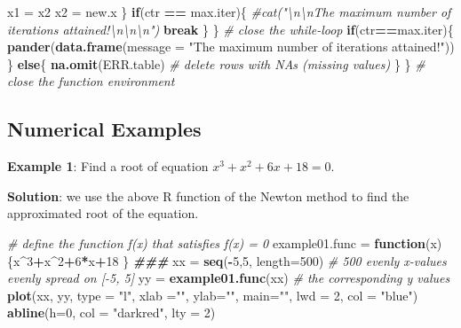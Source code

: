 \documentclass[
]{book}
\newenvironment{Shaded}{\begin{snugshade}}{\end{snugshade}}
\newcommand{\AttributeTok}[1]{\textcolor[rgb]{0.13,0.29,0.53}{#1}}
\newcommand{\CommentTok}[1]{\textcolor[rgb]{0.56,0.35,0.01}{\textit{#1}}}
\newcommand{\ControlFlowTok}[1]{\textcolor[rgb]{0.13,0.29,0.53}{\textbf{#1}}}
\newcommand{\DecValTok}[1]{\textcolor[rgb]{0.00,0.00,0.81}{#1}}
\newcommand{\DocumentationTok}[1]{\textcolor[rgb]{0.56,0.35,0.01}{\textbf{\textit{#1}}}}
\newcommand{\FunctionTok}[1]{\textcolor[rgb]{0.13,0.29,0.53}{\textbf{#1}}}
\newcommand{\NormalTok}[1]{#1}
\newcommand{\OtherTok}[1]{\textcolor[rgb]{0.56,0.35,0.01}{#1}}
\newcommand{\SpecialCharTok}[1]{\textcolor[rgb]{0.81,0.36,0.00}{\textbf{#1}}}
\newcommand{\StringTok}[1]{\textcolor[rgb]{0.31,0.60,0.02}{#1}}
\begin{document}
\begin{Shaded}
\begin{Highlighting}[]
\NormalTok{            x1 }\OtherTok{=}\NormalTok{ x2}
\NormalTok{            x2 }\OtherTok{=}\NormalTok{ new.x}
\NormalTok{         \}}
        \ControlFlowTok{if}\NormalTok{(ctr }\SpecialCharTok{==}\NormalTok{ max.iter)\{}
         \CommentTok{\#cat("\textbackslash{}n\textbackslash{}nThe maximum number of iterations attained!\textbackslash{}n\textbackslash{}n\textbackslash{}n")}
         \ControlFlowTok{break}
\NormalTok{       \}}
\NormalTok{   \}                     }\CommentTok{\# close the while{-}loop}
  \ControlFlowTok{if}\NormalTok{(ctr}\SpecialCharTok{==}\NormalTok{max.iter)\{}
    \FunctionTok{pander}\NormalTok{(}\FunctionTok{data.frame}\NormalTok{(}\AttributeTok{message =} \StringTok{"The maximum number of iterations attained!"}\NormalTok{))}
\NormalTok{  \} }\ControlFlowTok{else}\NormalTok{\{}
  \FunctionTok{na.omit}\NormalTok{(ERR.table)     }\CommentTok{\# delete rows with NAs (missing values)}
\NormalTok{  \}}
\NormalTok{\}                        }\CommentTok{\# close the function environment}
\end{Highlighting}
\end{Shaded}

\hypertarget{numerical-examples}{%
\subsection{Numerical Examples}\label{numerical-examples}}

\textbf{Example 1}: Find a root of equation \(x^3+x^2+6x+18 = 0\).

\textbf{Solution}: we use the above R function of the Newton method to find the approximated root of the equation.

\begin{Shaded}
\begin{Highlighting}[]
\CommentTok{\# define the function f(x) that satisfies f(x) = 0}
\NormalTok{example01.func }\OtherTok{=} \ControlFlowTok{function}\NormalTok{(x)\{x}\SpecialCharTok{\^{}}\DecValTok{3}\SpecialCharTok{+}\NormalTok{x}\SpecialCharTok{\^{}}\DecValTok{2}\SpecialCharTok{+}\DecValTok{6}\SpecialCharTok{*}\NormalTok{x}\SpecialCharTok{+}\DecValTok{18}\NormalTok{ \}}
\DocumentationTok{\#\#\#}
\NormalTok{xx }\OtherTok{=} \FunctionTok{seq}\NormalTok{(}\SpecialCharTok{{-}}\DecValTok{5}\NormalTok{,}\DecValTok{5}\NormalTok{, }\AttributeTok{length=}\DecValTok{500}\NormalTok{)    }\CommentTok{\# 500 evenly x{-}values evenly spread on [{-}5, 5]}
\NormalTok{yy }\OtherTok{=} \FunctionTok{example01.func}\NormalTok{(xx)       }\CommentTok{\# the corresponding y values}
\FunctionTok{plot}\NormalTok{(xx, yy, }\AttributeTok{type =} \StringTok{"l"}\NormalTok{, }\AttributeTok{xlab =}\StringTok{""}\NormalTok{, }\AttributeTok{ylab=}\StringTok{""}\NormalTok{, }\AttributeTok{main=}\StringTok{""}\NormalTok{, }\AttributeTok{lwd =} \DecValTok{2}\NormalTok{, }\AttributeTok{col =} \StringTok{"blue"}\NormalTok{)}
\FunctionTok{abline}\NormalTok{(}\AttributeTok{h=}\DecValTok{0}\NormalTok{, }\AttributeTok{col =} \StringTok{"darkred"}\NormalTok{, }\AttributeTok{lty =} \DecValTok{2}\NormalTok{)}
\end{Highlighting}
\end{Shaded}
\end{document}
